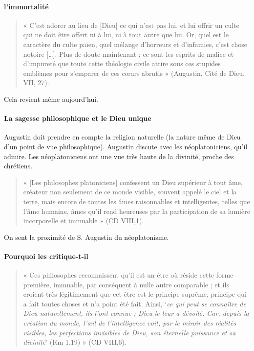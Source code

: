  \paragraph{l’immortalité}
 
 \begin{quote}
      « C’est adorer au lieu de [Dieu] ce qui n’est pas lui, et lui offrir un culte qui ne doit être offert ni à lui,
ni à tout autre que lui. Or, quel est le caractère du culte païen, quel mélange d’horreurs et d’infamies,
c’est chose notoire […]. Plus de doute maintenant ; ce sont les esprits de malice et d’impureté que
toute cette théologie civile attire sous ces stupides emblèmes pour s’emparer de ces cœurs abrutis »
(Augustin, Cité de Dieu, VII, 27).
 \end{quote}
 Cela revient même aujourd'hui. 
 
 
 \paragraph{La sagesse philosophique et le Dieu unique} Augustin doit prendre en compte la religion naturelle (la nature même de Dieu d'un point de vue philosophique). Augustin discute avec les néoplatoniciens, qu'il admire. Les néoplatoniciens ont une vue très haute de la divinité, proche des chrétiens.
 
 
 
 \begin{quote}
     « [Les philosophes platoniciens] confessent un Dieu supérieur à tout âme, créateur non seulement de
ce monde visible, souvent appelé le ciel et la terre, mais encore de toutes les âmes raisonnables et
intelligentes, telles que l’âme humaine, âmes qu’il rend heureuses par la participation de sa lumière
incorporelle et immuable » (CD VIII,1).
 \end{quote}
 

 
 On sent la proximité de S. Augustin du néoplatonisme.
 
 \paragraph{Pourquoi les critique-t-il}
 
  \begin{quote}
     « Ces philosophes reconnaissent qu’il est un être où réside cette forme première, immuable, par
conséquent à nulle autre comparable ; et ils croient très légitimement que cet être est le principe
suprême, principe qui a fait toutes choses et n’a point été fait. Ainsi, ‘\textit{ce qui peut se connaître de Dieu
naturellement, ils l’ont connue ; Dieu le leur a dévoilé. Car, depuis la création du monde, l’œil de
l’intelligence voit, par le miroir des réalités visibles, les perfections invisibles de Dieu, son éternelle
puissance et sa divinité}’ (Rm 1,19) » (CD VIII,6).
 \end{quote}
 
